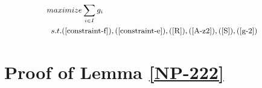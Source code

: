 \documentclass[sigconf]{acmart}
\begin{document}
\begin{appendices}
%







\begin{equation}
\small
\begin{aligned} \label{P8}
 &maximize  \sum_{i\in I} g_i\\
&\begin{array}{r@{\quad}r@{}l@{\quad}l}
s.t.
(\ref{constraint-f}), (\ref{constraint-e}), (\ref{R}), (\ref{A-z2}), (\ref{S}), (\ref{g-2})
\end{array}
\end{aligned}
\end{equation}
\section{Proof of Lemma \ref{NP-222}} \label{appendix-proof}


\end{appendices}
\end{document}
